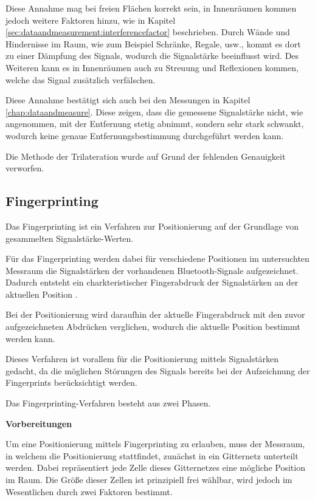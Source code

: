 Diese Annahme mag bei freien Flächen korrekt sein, in Innenräumen kommen jedoch weitere Faktoren hinzu, wie in Kapitel \ref{sec:dataandmeasurement:interferencefactor} beschrieben. 
Durch Wände und Hindernisse im Raum, wie zum Beispiel Schränke, Regale, usw., kommt es dort zu einer Dämpfung des Signals, wodurch die Signalstärke beeinflusst wird. Des Weiteren kann es in Innenräumen auch zu Streuung und Reflexionen kommen, welche das Signal zusätzlich verfälschen.

Diese Annahme bestätigt sich auch bei den Messungen in Kapitel \ref{chap:dataandmeasure}. Diese zeigen, dass die gemessene Signalstärke nicht, wie angenommen, mit der Entfernung stetig abnimmt, sondern sehr stark schwankt, wodurch keine genaue Entfernungsbestimmung durchgeführt werden kann.

Die Methode der Trilateration wurde auf Grund der fehlenden Genauigkeit verworfen. 

\subsection{Fingerprinting}
\label{sec:implementation:positioning:fingerprinting}
Das Fingerprinting ist ein Verfahren zur Positionierung auf der Grundlage von gesammelten Signalstärke-Werten.

Für das Fingerprinting werden dabei für verschiedene Positionen im untersuchten Messraum die Signalstärken der vorhandenen Bluetooth-Signale aufgezeichnet. 
Dadurch entsteht ein charkteristischer Fingerabdruck der Signalstärken an der aktuellen Position \cite{wififingerprinting}.

Bei der Positionierung wird daraufhin der aktuelle Fingerabdruck mit den zuvor aufgezeichneten Abdrücken verglichen, wodurch die aktuelle Position bestimmt werden kann.

Dieses Verfahren ist vorallem für die Positionierung mittels Signalstärken gedacht, da die möglichen Störungen des Signals bereits bei der Aufzeichnung der Fingerprints berücksichtigt werden.

Das Fingerprinting-Verfahren besteht aus zwei Phasen.


\textbf{Vorbereitungen}

Um eine Positionierung mittels Fingerprinting zu erlauben, muss der Messraum, in welchem die Positionierung stattfindet, zunächst in ein Gitternetz unterteilt werden. Dabei repräsentiert jede Zelle dieses Gitternetzes eine mögliche Position im Raum.
Die Größe dieser Zellen ist prinzipiell frei wählbar, wird jedoch im Wesentlichen durch zwei Faktoren bestimmt. 

